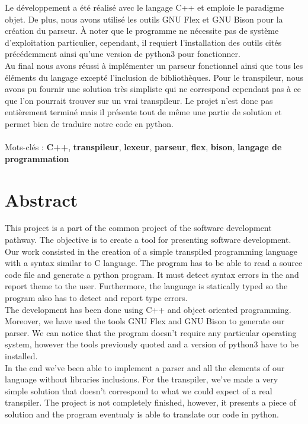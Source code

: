 \documentclass[a4paper]{article}%
\begin{document}
Le développement a été réalisé avec le langage C++ et emploie le paradigme objet.
De plus, nous avons utilisé les outils GNU Flex et GNU Bison pour la création du
parseur. À noter que le programme ne nécessite pas de système d'exploitation
particulier, cependant, il requiert l'installation des outils cités précédemment
ainsi qu'une version de python3 pour fonctionner.\\

Au final nous avons réussi à implémenter un parseur fonctionnel ainsi que tous
les éléments du langage excepté l'inclusion de bibliothèques. Pour le
transpileur, nous avons pu fournir une solution très simpliste qui ne correspond
cependant pas à ce que l'on pourrait trouver sur un vrai transpileur. Le projet
n'est donc pas entièrement terminé mais il présente tout de même une partie de
solution et permet bien de traduire notre code en python.
\\~\\

\noindent
Mots-clés : \textbf{C++}, \textbf{transpileur}, \textbf{lexeur}, \textbf{parseur},
\textbf{flex}, \textbf{bison},  \textbf{langage de programmation}

\section*{Abstract}

This project is a part of the common project of the software development
pathway. The objective is to create a tool for presenting software development.
Our work consisted in the creation of a simple transpiled programming language
with a syntax similar to C language. The program has to be able to read a source
code file and generate a python program. It must detect syntax errors in the and
report theme to the user. Furthermore, the language is statically typed so the
program also has to detect and report type errors.\\

The development has been done using C++ and object oriented programming.
Moreover, we have used the tools GNU Flex and GNU Bison to generate our parser.
We can notice that the program doesn't require any particular operating system,
however the tools previously quoted and a version of python3 have to be
installed.\\

In the end we've been able to implement a parser and all the elements of our
language without libraries inclusions. For the transpiler, we've made a very
simple solution that doesn't correspond to what we could expect of a real
transpiler. The project is not completely finished, however, it presents a piece
of solution and the program eventualy is able to translate our code in python.
\\~\\
\end{document}
